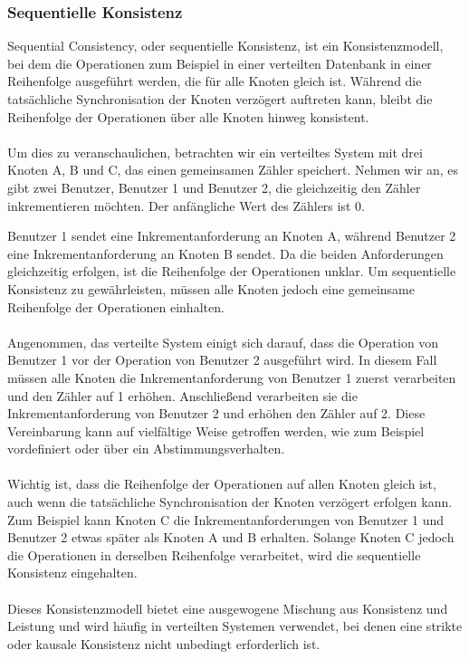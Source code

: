 \documentclass[../vs-script-first-v01.tex]{subfiles}
\begin{document}
\subsubsection{Sequentielle Konsistenz}
Sequential Consistency, oder sequentielle Konsistenz, ist ein Konsistenzmodell, bei dem die Operationen zum Beispiel in einer verteilten Datenbank in einer Reihenfolge ausgeführt werden, die für alle Knoten gleich ist. Während die tatsächliche Synchronisation der Knoten verzögert auftreten kann, bleibt die Reihenfolge der Operationen über alle Knoten hinweg konsistent.
\\\\
Um dies zu veranschaulichen, betrachten wir ein verteiltes System mit drei Knoten A, B und C, das einen gemeinsamen Zähler speichert. Nehmen wir an, es gibt zwei Benutzer, Benutzer 1 und Benutzer 2, die gleichzeitig den Zähler inkrementieren möchten. Der anfängliche Wert des Zählers ist 0.

Benutzer 1 sendet eine Inkrementanforderung an Knoten A, während Benutzer 2 eine Inkrementanforderung an Knoten B sendet. Da die beiden Anforderungen gleichzeitig erfolgen, ist die Reihenfolge der Operationen unklar. Um sequentielle Konsistenz zu gewährleisten, müssen alle Knoten jedoch eine gemeinsame Reihenfolge der Operationen einhalten.
\\\\
Angenommen, das verteilte System einigt sich darauf, dass die Operation von Benutzer 1 vor der Operation von Benutzer 2 ausgeführt wird. In diesem Fall müssen alle Knoten die Inkrementanforderung von Benutzer 1 zuerst verarbeiten und den Zähler auf 1 erhöhen. Anschließend verarbeiten sie die Inkrementanforderung von Benutzer 2 und erhöhen den Zähler auf 2.
Diese Vereinbarung kann auf vielfältige Weise getroffen werden, wie zum Beispiel vordefiniert oder über ein Abstimmungsverhalten. 
\\\\
Wichtig ist, dass die Reihenfolge der Operationen auf allen Knoten gleich ist, auch wenn die tatsächliche Synchronisation der Knoten verzögert erfolgen kann. Zum Beispiel kann Knoten C die Inkrementanforderungen von Benutzer 1 und Benutzer 2 etwas später als Knoten A und B erhalten. Solange Knoten C jedoch die Operationen in derselben Reihenfolge verarbeitet, wird die sequentielle Konsistenz eingehalten.
\\\\
Dieses Konsistenzmodell bietet eine ausgewogene Mischung aus Konsistenz und Leistung und wird häufig in verteilten Systemen verwendet, bei denen eine strikte oder kausale Konsistenz nicht unbedingt erforderlich ist.
\end{document}
